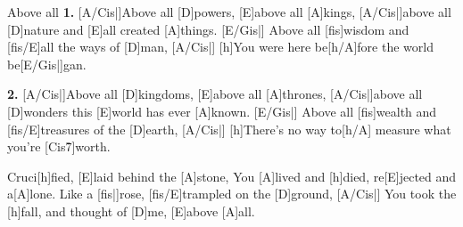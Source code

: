 \begin{song}{Above all}
{\bf 1.} [A/Cis|]{Above} all [D]powers, [E]above all [A]kings,
[A/Cis|]{above} all [D]nature and [E]all created [A]things. [E/Gis|]{\quad}
Above all [fis]wisdom and [fis/E]all the ways of [D]man, [A/Cis|]{\quad}
[h]You were here be[h/A]fore the world be[E/Gis|]{gan.}

{\bf 2.} [A/Cis|]{Above} all [D]kingdoms, [E]above all [A]thrones,
[A/Cis|]{above} all [D]wonders this [E]world has ever [A]known.  [E/Gis|]{\quad}
Above all [fis]wealth and [fis/E]treasures of the [D]earth, [A/Cis|]{\quad}
[h]There's no way to[h/A] measure what you're [Cis\h7]worth.

\begin{chorus}
[A]Cruci[h]fied, [E]laid behind the [A]stone,
You [A]lived and [h]died, re[E]jected and a[A]lone.
Like a [fis|]{rose,} [fis/E]trampled on the [D]ground,  [A/Cis|]{\quad}
You took the [h]fall, and thought of [D]me, [E]above [A]all.   
\end{chorus}
\end{song}